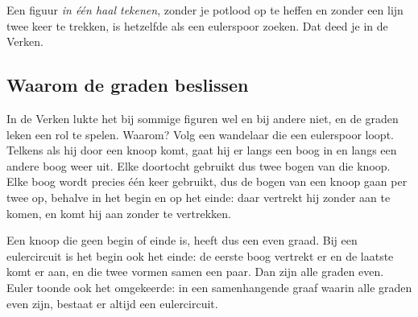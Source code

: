 Een figuur \textit{in één haal tekenen}, zonder je potlood op te heffen en zonder een lijn twee keer te trekken, is hetzelfde als een eulerspoor zoeken. Dat deed je in de Verken.

\begin{oefeningen}
\end{oefeningen}

\subsection{Waarom de graden beslissen}

In de Verken lukte het bij sommige figuren wel en bij andere niet, en de graden leken een rol te spelen. Waarom? Volg een wandelaar die een eulerspoor loopt. Telkens als hij door een knoop komt, gaat hij er langs een boog in en langs een andere boog weer uit. Elke doortocht gebruikt dus twee bogen van die knoop. Elke boog wordt precies één keer gebruikt, dus de bogen van een knoop gaan per twee op, behalve in het begin en op het einde: daar vertrekt hij zonder aan te komen, en komt hij aan zonder te vertrekken.


Een knoop die geen begin of einde is, heeft dus een even graad. Bij een eulercircuit is het begin ook het einde: de eerste boog vertrekt er en de laatste komt er aan, en die twee vormen samen een paar. Dan zijn alle graden even. Euler toonde ook het omgekeerde: in een samenhangende graaf waarin alle graden even zijn, bestaat er altijd een eulercircuit.

